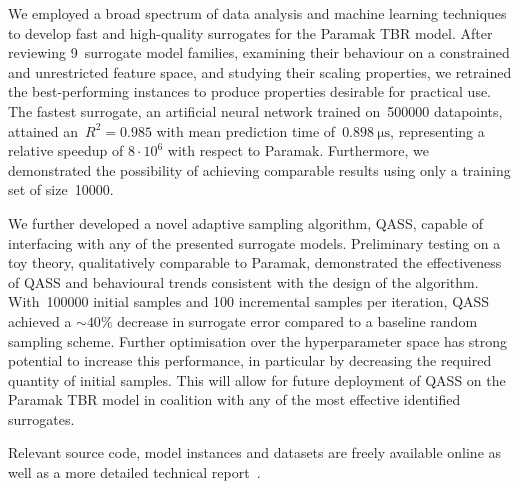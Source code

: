 We employed a broad spectrum of data
analysis and machine learning techniques to develop fast and high-quality
surrogates for the Paramak TBR model. After reviewing
9~surrogate model families, examining their behaviour on a constrained and
unrestricted feature space, and studying their scaling properties, we retrained
the best-performing instances to produce properties desirable for
practical use. The fastest surrogate, an artificial neural network trained
on~\num{500000} datapoints, attained an~$R^2=\num{0.985}$ with mean prediction time
of~$\SI{0.898}{\micro\second}$, representing a relative
speedup of $8\cdot 10^6$ with respect to Paramak. Furthermore, we demonstrated the possibility of achieving comparable results using only a
training set of size~\num{10000}.

We further developed a novel adaptive
sampling algorithm, QASS, capable of interfacing with any of the presented
surrogate models.
Preliminary testing on a toy theory, qualitatively comparable to
Paramak, demonstrated the effectiveness of QASS and behavioural trends
consistent with the design of the algorithm. With~\num{100000} initial samples
and 100 incremental samples per iteration, QASS achieved a ${\sim}40\%$ decrease
in surrogate error compared to a baseline random sampling scheme. Further optimisation over the hyperparameter space has strong potential to increase this performance, in particular by decreasing the required quantity of initial samples. This will allow for future deployment of QASS on the Paramak TBR model in coalition with any of the most effective identified surrogates.

Relevant source code, model instances and datasets are freely
available online as well as a more detailed technical
report~\cite{github,finalreport}.
